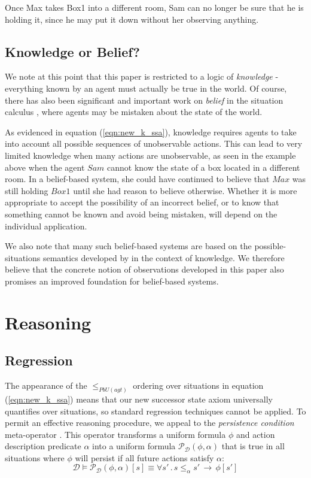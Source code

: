 \documentclass{ifaamas-submission}
\begin{document}
Once Max takes Box1 into a different room, Sam can no longer be sure
that he is holding it, since he may put it down without her observing
anything.


\subsection{Knowledge or Belief?}

We note at this point that this paper is restricted to a logic of
\emph{knowledge} - everything known by an agent must actually be true
in the world. Of course, there has also been significant and important
work on \emph{belief} in the situation calculus \cite{shapiro00sc_belief},
where agents may be mistaken about the state of the world.

As evidenced in equation (\ref{eqn:new_k_ssa}), knowledge requires
agents to take into account all possible sequences of unobservable
actions. This can lead to very limited knowledge when many actions
are unobservable, as seen in the example above when the agent $Sam$
cannot know the state of a box located in a different room. In a belief-based
system, she could have continued to believe that $Max$ was still
holding $Box1$ until she had reason to believe otherwise. Whether
it is more appropriate to accept the possibility of an incorrect belief,
or to know that something cannot be known and avoid being mistaken,
will depend on the individual application.

We also note that many such belief-based systems are based on the
possible-situations semantics developed by \cite{scherl03sc_knowledge}
in the context of knowledge. We therefore believe that the concrete
notion of observations developed in this paper also promises an improved
foundation for belief-based systems.


\section{Reasoning}

\label{sec:Reasoning}


\subsection{Regression}

The appearance of the $\leq_{PbU(agt)}$ ordering over situations
in equation (\ref{eqn:new_k_ssa}) means that our new successor state
axiom universally quantifies over situations, so standard regression
techniques cannot be applied. To permit an effective reasoning procedure,
we appeal to the \emph{persistence condition} meta-operator \cite{kelly07sc_persistence}.
This operator transforms a uniform formula $\phi$ and action description
predicate $\alpha$ into a uniform formula $\mathcal{P}_{\mathcal{D}}(\phi,\alpha)$
that is true in all situations where $\phi$ will persist if all future
actions satisfy $\alpha$:\[
\mathcal{D}\models\mathcal{P}_{\mathcal{D}}(\phi,\alpha)[s]\equiv\forall s'\,.\, s\leq_{\alpha}s'\,\rightarrow\,\phi[s']\]
\end{document}
